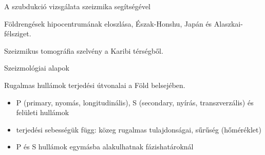 \documentclass{beamer}
\begin{document}
\begin{frame}{A szubdukció vizsgálata szeizmika segítségével}
    \begin{minipage}[c]{0.45\textwidth}
        \centering
        
        Földrengések hipocentrumának eloszlása, Észak-Honshu, Japán és Alaszkai-félsziget. \cite{abers}
    \end{minipage}
    \hspace{10pt}
    \begin{minipage}[c]{0.45\textwidth}
        \centering
        
        Szeizmikus tomográfia szelvény a Karibi térségből.
    \end{minipage}
\end{frame}


\begin{frame}{Szeizmológiai alapok}
    \begin{minipage}[c]{0.45\textwidth}
        \centering
        
        Rugalmas hullámok terjedési útvonalai a Föld belsejében. \cite{wysession}
    \end{minipage}
    \hspace{5pt}
    \begin{minipage}[c]{0.5\textwidth}
        \begin{itemize}
            \item P (primary, nyomás, longitudinális), S (secondary, nyírás, transzverzális) és felületi hullámok
            \item terjedési sebességük függ: közeg rugalmas tulajdonságai, sűrűség (hőméréklet)
            \item P és S hullámok egymásba alakulhatnak fázishatároknál
        \end{itemize}
    \end{minipage}
\end{frame}
\end{document}
